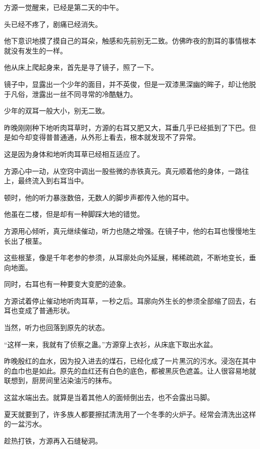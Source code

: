 
\begin{this_body}



方源一觉醒来，已经是第二天的中午。

头已经不疼了，剧痛已经消失。

他下意识地摸了摸自己的耳朵，触感和先前别无二致。仿佛昨夜的割耳的事情根本就没有发生的一样。

他从床上爬起身来，首先是寻了镜子，照了一下。

镜子中，显露出一个少年的面目，并不英俊，但是一双漆黑深幽的眸子，却让他脱于凡俗，泄露出一丝不同寻常的冷酷魅力。

少年的双耳一般大小，别无二致。

昨晚刚刚种下地听肉耳草时，方源的右耳又肥又大，耳垂几乎已经抵到了下巴。但是如今却变得普普通通，从外形上看去，根本就发现不了异常。

这是因为身体和地听肉耳草已经相互适应了。

方源心中一动，从空窍中调出一股些微的赤铁真元。真元顺着他的身体，一路往上，最终流入到右耳当中。

顿时，他的听力暴涨数倍，无数人的脚步声都传入他的耳中。

他虽在二楼，但是却有一种脚踩大地的错觉。

方源用心倾听，真元继续催动，听力也随之增强。在镜子中，他的右耳也慢慢地生长出了根茎。

这些根茎，像是千年老参的参须，从耳廓处向外延展，稀稀疏疏，不断地变长，垂向地面。

同时，右耳也有一种要变大变肥的迹象。

方源试着停止催动地听肉耳草，一秒之后。耳廓向外生长的参须全部缩了回去，右耳也变成了普通形状。

当然，听力也回落到原先的状态。

“这样一来，我就有了侦察之蛊。”方源穿上衣衫，从床底下取出水盆。

昨晚殷红的血水，因为投入进去的煤石，已经化成了一片黑沉的污水。浸泡在其中的血巾也是如此。原先的血红还有白色的底色，都被黑灰色遮盖。让人很容易地就联想到，厨房间里沾染油污的抹布。

这盆水端出去。就算是当着其他人的面倾倒出去，也不会露出马脚。

夏天就要到了，许多族人都要擦拭清洗用了一个冬季的火炉子。经常会清洗出这样的一盆污水。

趁热打铁，方源再入石缝秘洞。


\end{this_body}
